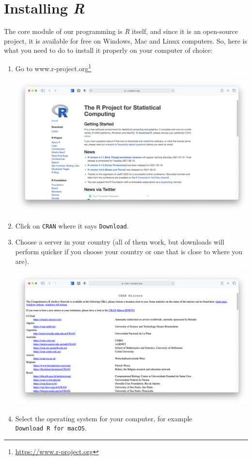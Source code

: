 \documentclass[
  letterpaper,
]{krantz}
\renewcommand{\href}[2]{#2\footnote{\url{#1}}}
\begin{document}
\section{\texorpdfstring{Installing
\emph{R}}{Installing R}}\label{sec-installing-r}

The core module of our programming is \emph{R} itself, and since it is
an open-source project, it is available for free on Windows, Mac and
Linux computers. So, here is what you need to do to install it properly
on your computer of choice:

\begin{enumerate}
\def\labelenumi{\arabic{enumi}.}
\item
  Go to \href{https://www.r-project.org}{www.r-project.org}

  \includegraphics{images/chapter_03_img/r_project/00_r_project_page.png}
\item
  Click on \texttt{CRAN} where it says \texttt{Download}.
\item
  Choose a server in your country (all of them work, but downloads will
  perform quicker if you choose your country or one that is close to
  where you are).

  \includegraphics{images/chapter_03_img/r_project/01_r_project_cran_mirror.png}
\item
  Select the operating system for your computer, for example
  \texttt{Download\ R\ for\ macOS}.


\end{enumerate}
\end{document}
